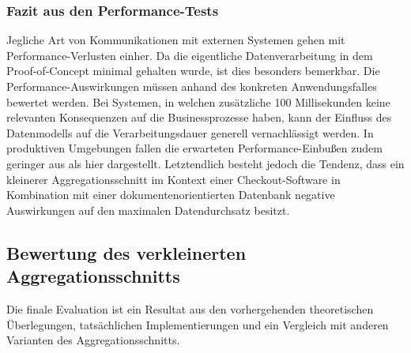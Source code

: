 \pagebreak

\subsubsection{Fazit aus den Performance-Tests}

Jegliche Art von Kommunikationen mit externen Systemen gehen mit Performance-Verlusten einher. Da die eigentliche Datenverarbeitung in dem Proof-of-Concept minimal gehalten wurde, ist dies besonders bemerkbar. Die Performance-Auswirkungen müssen anhand des konkreten Anwendungsfalles bewertet werden. Bei Systemen, in welchen zusätzliche 100 Millisekunden keine relevanten Konsequenzen auf die Businessprozesse haben, kann der Einfluss des Datenmodells auf die Verarbeitungsdauer generell vernachlässigt werden. In produktiven Umgebungen fallen die erwarteten Performance-Einbußen zudem geringer aus als hier dargestellt. Letztendlich besteht jedoch die Tendenz, dass ein kleinerer Aggregationsschnitt im Kontext einer Checkout-Software in Kombination mit einer dokumentenorientierten Datenbank negative Auswirkungen auf den maximalen Datendurchsatz besitzt. \\

\subsection{Bewertung des verkleinerten Aggregationsschnitts}

Die finale Evaluation ist ein Resultat aus den vorhergehenden theoretischen Überlegungen, tatsächlichen Implementierungen und ein Vergleich mit anderen Varianten des Aggregationsschnitts.


